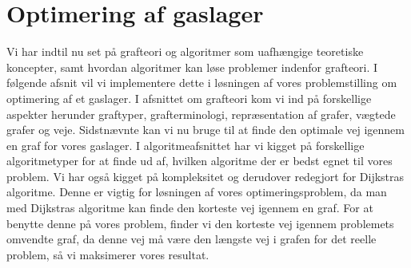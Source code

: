 \chapter{Optimering af gaslager}
Vi har indtil nu set på grafteori og algoritmer som  uafhængige teoretiske koncepter, samt hvordan algoritmer kan løse problemer indenfor grafteori. I følgende afsnit vil vi implementere dette i løsningen af vores problemstilling om optimering af et gaslager. I afsnittet om grafteori kom vi ind på forskellige aspekter herunder graftyper, grafterminologi, repræsentation af grafer, vægtede grafer og veje. Sidstnævnte kan vi nu bruge til at finde den optimale vej igennem en graf for vores gaslager. I algoritmeafsnittet har vi kigget på forskellige algoritmetyper for at finde ud af, hvilken algoritme der er bedst egnet til vores problem. Vi har også kigget på kompleksitet og derudover redegjort for Dijkstras algoritme. Denne er vigtig for løsningen af vores optimeringsproblem, da man med Dijkstras algoritme kan finde den korteste vej igennem en graf. For at benytte denne på vores problem, finder vi den korteste vej igennem problemets omvendte graf, da denne vej må være den længste vej i grafen for det reelle problem, så vi maksimerer vores resultat.




















